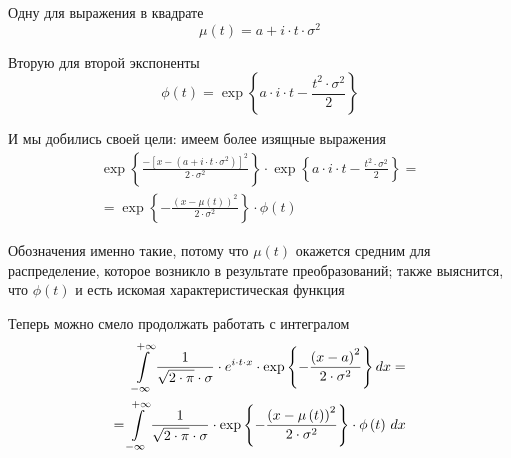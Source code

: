 \begin{enumerate}
\begin{enumerate}
                Одну для выражения в квадрате
                $$\mu\left( t \right)
                    = a + i \cdot t \cdot \sigma^2$$

                Вторую для второй экспоненты
                $$\phi\left( t \right)
                    = \exp{\left\{ a \cdot i \cdot t
                        - \frac{t^2 \cdot \sigma^2}{2} \right\}}$$

                И мы добились своей цели: имеем более изящные выражения
                \begin{align*}
                    \exp{\left\{ \frac{-\left[ x - \left( a
                            + i \cdot t \cdot \sigma^2 \right) \right]^2}
                            {2 \cdot \sigma^2} \right\}}
                        \cdot \exp{ \left\{ a \cdot i \cdot t
                            - \frac{t^2 \cdot \sigma^2}{2}  \right\}} = \\
                            = \exp{\left\{
                                    -\frac{\left( x
                                            - \mu\left( t \right) \right)^2}
                                        {2 \cdot \sigma^2} \right\}}
                                \cdot \phi\left( t \right)
                \end{align*}

                Обозначения именно такие, потому что $\mu\left( t \right)$
                окажется средним для распределение,
                которое возникло в результате преобразований;
                также выяснится, что $\phi\left( t \right)$ и есть
                искомая характеристическая функция
        \end{enumerate}
\end{enumerate}

Теперь можно смело продолжать работать с интегралом
\begin{align*}
    \integral{-\infty}{+\infty}{x}{
        \frac{1}{\sqrt{2 \cdot \pi} \cdot \sigma}
            \cdot e^{i \cdot t \cdot x}
            \cdot \exp{\left\{
                -\frac{\left( x-a \right)^2}{2 \cdot \sigma^2} \right\}}} = \\
        = \integral{-\infty}{+\infty}{x}{
            \frac{1}{\sqrt{2 \cdot \pi} \cdot \sigma}
            \cdot \exp{\left\{ -\frac{\left( x - \mu\left( t \right) \right)^2}
                {2 \cdot \sigma^2} \right\}}
            \cdot \phi\left( t \right)}
\end{align*}

